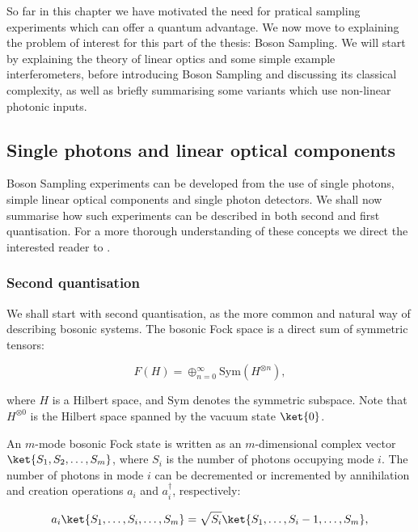 So far in this chapter we have motivated the need for pratical sampling experiments which can offer a quantum advantage. We now move to explaining the problem of interest for this part of the thesis: Boson Sampling. We will start by explaining the theory of linear optics and some simple example interferometers, before introducing Boson Sampling and discussing its classical complexity, as well as briefly summarising some variants which use non-linear photonic inputs.

\subsection{Single photons and linear optical components}

Boson Sampling experiments can be developed from the use of single photons, simple linear optical components and single photon detectors. We shall now summarise how such experiments can be described in both second and first quantisation. For a more thorough understanding of these concepts we direct the interested reader to \cite{fox2006, gerry2012}.

\subsubsection{Second quantisation}

We shall start with second quantisation, as the more common and natural way of describing bosonic systems. The bosonic Fock space is a direct sum of symmetric tensors:

\begin{equation}
F(H) = \oplus_{n=0}^\infty\textrm{Sym}(H^{\otimes n}),
\end{equation}

\noindent where $H$ is a Hilbert space, and $\textrm{Sym}$ denotes the symmetric subspace. Note that $H^{\otimes 0}$ is the Hilbert space spanned by the vacuum state $\ket{0}$.

An $m$-mode bosonic Fock state is written as an $m$-dimensional complex vector $\ket{S_1,S_2,\dots,S_m}$, where $S_i$ is the number of photons occupying mode $i$. The number of photons in mode $i$ can be decremented or incremented by annihilation and creation operations $a_i$ and $a_i^\dagger$, respectively:

\begin{equation}
a_i\ket{S_1,\dots,S_i,\dots,S_m} = \sqrt{S_i}\ket{S_1,\dots,S_i-1,\dots,S_m},
\end{equation}

